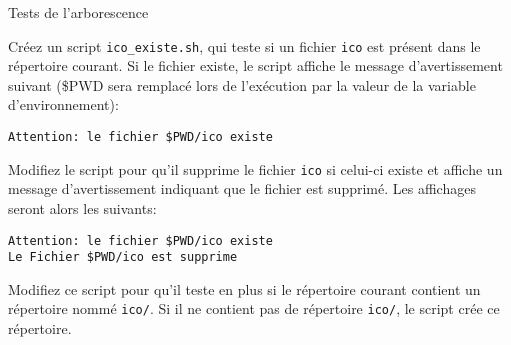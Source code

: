 \begin{exercice}
  \begin{exercicelet}{Tests de l'arborescence}
    \begin{questions}
    \item Créez un script \texttt{ico\_existe.sh}, qui teste si un fichier \texttt{ico} est présent dans le répertoire courant. Si le fichier existe, le script affiche le message d'avertissement suivant (\$PWD sera remplacé lors de l'exécution par la valeur de la variable d'environnement):
    \begin{minipage}[c]{5cm}
    \begin{verbatim}
Attention: le fichier $PWD/ico existe
	\end{verbatim}
	\end{minipage}
	
	
	\item Modifiez le script pour qu’il supprime le fichier \texttt{ico} si celui-ci existe et affiche un message d'avertissement indiquant que le fichier est supprimé. Les affichages seront alors les suivants:
	\begin{minipage}[c]{5cm}
    \begin{verbatim}
Attention: le fichier $PWD/ico existe
Le Fichier $PWD/ico est supprime
	\end{verbatim}
	\end{minipage}
    \item Modifiez ce script pour qu'il teste en plus si le répertoire courant contient un répertoire nommé \texttt{ico/}. Si il ne contient pas de répertoire \texttt{ico/}, le script crée ce répertoire.
    \end{questions}
  \end{exercicelet}
\end{exercice}

